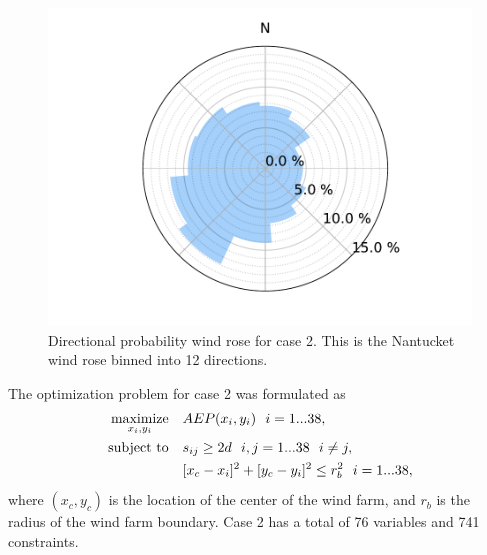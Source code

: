 \documentclass[hidelinks,sort&compress,AMA,STIX1COL]{WileyNJD-v2}
\providecommand{\DIFaddbeginFL}{} %
\providecommand{\DIFaddendFL}{} %
\providecommand{\DIFdelendFL}{} %
\newcommand{\DIFaddincludegraphics}[2][]{{\color{blue}\fbox{\DIFOincludegraphics[#1]{#2}}}} %
\DeclareRobustCommand{\DIFaddbeginFL}{\DIFOaddbeginFL \let\includegraphics\DIFaddincludegraphics} %
\DeclareRobustCommand{\DIFaddendFL}{\DIFOaddendFL \let\includegraphics\DIFOincludegraphics} %
\DeclareRobustCommand{\DIFdelendFL}{\DIFOaddendFL \let\includegraphics\DIFOincludegraphics} %
\begin{document}
\begin{figure}[h!]
\begin{minipage}[t]{18pc}
\DIFdelendFL \DIFaddbeginFL \includegraphics[width=\textwidth, trim={1.5cm 0cm 1.5cm 0cm}, clip]{final_images/windroses/Figure_11.pdf}
		\DIFaddendFL \caption{Directional probability wind rose for case 2. This is the Nantucket wind rose binned into 12 directions\cite{wrcc2017}.}
		\label{fig:freqwindrose_12dir}
	\end{minipage}
\end{figure}

The optimization problem for case 2 was formulated as
%
\begin{equation}\label{eq:case2}
	\begin{aligned} [b]
	\underset{x_i,y_i}{\textrm{maximize}} \quad & AEP(x_i,y_i)~~i=1...38,\\
	\textrm{subject to} \quad & s_{ij} \geq 2\*d~~i,j=1...38~~i \neq j,\\
	 & [x_c-x_i]^2+[y_c-y_i]^2 \leq r_{b}^2~~i=1...38,
	\end{aligned}
\end{equation}
%
where $(x_c,y_c)$ is the location of the center of the wind farm, and $r_b$ is the radius of the wind farm boundary. Case 2 has a total of 76 variables and 741 constraints.
\end{document}
